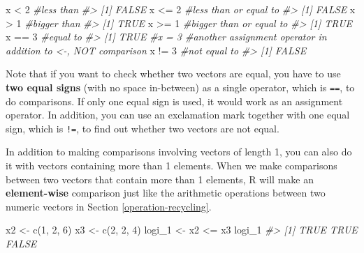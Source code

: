 \documentclass[
]{book}
\newenvironment{Shaded}{\begin{snugshade}}{\end{snugshade}}
\newcommand{\CommentTok}[1]{\textcolor[rgb]{0.56,0.35,0.01}{\textit{#1}}}
\newcommand{\DecValTok}[1]{\textcolor[rgb]{0.00,0.00,0.81}{#1}}
\newcommand{\FunctionTok}[1]{\textcolor[rgb]{0.00,0.00,0.00}{#1}}
\newcommand{\NormalTok}[1]{#1}
\newcommand{\OtherTok}[1]{\textcolor[rgb]{0.56,0.35,0.01}{#1}}
\newcommand{\SpecialCharTok}[1]{\textcolor[rgb]{0.00,0.00,0.00}{#1}}
\begin{document}
\begin{Shaded}
\begin{Highlighting}[]
\NormalTok{x }\SpecialCharTok{\textless{}} \DecValTok{2}      \CommentTok{\#less than}
\CommentTok{\#\textgreater{} [1] FALSE}
\NormalTok{x }\SpecialCharTok{\textless{}=} \DecValTok{2}     \CommentTok{\#less than or equal to}
\CommentTok{\#\textgreater{} [1] FALSE}
\NormalTok{x }\SpecialCharTok{\textgreater{}} \DecValTok{1}      \CommentTok{\#bigger than}
\CommentTok{\#\textgreater{} [1] TRUE}
\NormalTok{x }\SpecialCharTok{\textgreater{}=} \DecValTok{1}     \CommentTok{\#bigger than or equal to}
\CommentTok{\#\textgreater{} [1] TRUE}
\NormalTok{x }\SpecialCharTok{==} \DecValTok{3}     \CommentTok{\#equal to}
\CommentTok{\#\textgreater{} [1] TRUE}
\CommentTok{\#x = 3     \#another assignment operator in addition to \textasciigrave{}\textless{}{-}\textasciigrave{}, NOT comparison}
\NormalTok{x }\SpecialCharTok{!=} \DecValTok{3}     \CommentTok{\#not equal to}
\CommentTok{\#\textgreater{} [1] FALSE}
\end{Highlighting}
\end{Shaded}

Note that if you want to check whether two vectors are equal, you have to use \textbf{two equal signs} (with no space in-between) as a single operator, which is \texttt{==}, to do comparisons. If only one equal sign is used, it would work as an assignment operator. In addition, you can use an exclamation mark together with one equal sign, which is \texttt{!=}, to find out whether two vectors are not equal.

In addition to making comparisons involving vectors of length 1, you can also do it with vectors containing more than 1 elements. When we make comparisons between two vectors that contain more than 1 elements, R will make an \textbf{element-wise} comparison just like the arithmetic operations between two numeric vectors in Section \ref{operation-recycling}.

\begin{Shaded}
\begin{Highlighting}[]
\NormalTok{x2 }\OtherTok{\textless{}{-}} \FunctionTok{c}\NormalTok{(}\DecValTok{1}\NormalTok{, }\DecValTok{2}\NormalTok{, }\DecValTok{6}\NormalTok{)}
\NormalTok{x3 }\OtherTok{\textless{}{-}} \FunctionTok{c}\NormalTok{(}\DecValTok{2}\NormalTok{, }\DecValTok{2}\NormalTok{, }\DecValTok{4}\NormalTok{)}
\NormalTok{logi\_1 }\OtherTok{\textless{}{-}}\NormalTok{ x2 }\SpecialCharTok{\textless{}=}\NormalTok{ x3}
\NormalTok{logi\_1 }
\CommentTok{\#\textgreater{} [1]  TRUE  TRUE FALSE}
\end{Highlighting}
\end{Shaded}
\end{document}
